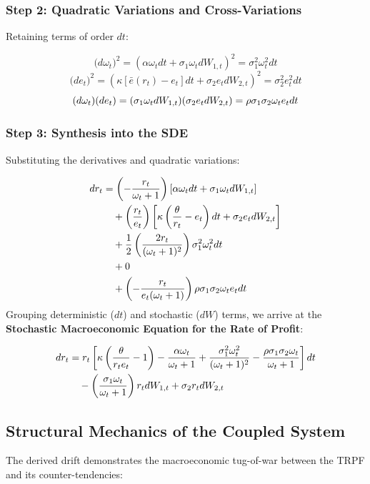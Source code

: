 \documentclass[11pt,letterpaper]{report}
\newcommand{\fitmath}[1]{\begingroup\setbox0=\hbox{$\displaystyle #1$}\ifdim\wd0>\linewidth\resizebox{\linewidth}{!}{$\displaystyle #1$}\else\displaystyle #1\fi\endgroup}
\begin{document}
\subsubsection{Step 2: Quadratic Variations and Cross-Variations}
Retaining terms of order $dt$:

\[
(d{\omega }_{t}{)}^{2}={\left({\alpha {\omega }_{t}dt+{\sigma }_{1}{\omega }_{t}d{W}_{1,t}}\right)}^{2}={\sigma }_{1}^{2}{\omega }_{t}^{2}dt
\]
\[
(d{e}_{t}{)}^{2}={\left({\kappa [\bar{e}({r}_{t})-{e}_{t}]dt+{\sigma }_{2}{e}_{t}d{W}_{2,t}}\right)}^{2}={\sigma }_{2}^{2}{e}_{t}^{2}dt
\]
\[\fitmath{(d{\omega }_{t})(d{e}_{t})=({\sigma }_{1}{\omega }_{t}d{W}_{1,t})({\sigma }_{2}{e}_{t}d{W}_{2,t})=\rho {\sigma }_{1}{\sigma }_{2}{\omega }_{t}{e}_{t}dt}\]
\subsubsection{Step 3: Synthesis into the SDE}
Substituting the derivatives and quadratic variations:

\[\fitmath{\begin{aligned} dr_t &= \left( -\frac{r_t}{\omega_t + 1} \right) \left[ \alpha \omega_t dt + \sigma_1 \omega_t dW_{1,t} \right] \\ &\quad + \left( \frac{r_t}{e_t} \right) \left[ \kappa \left( \frac{\theta}{r_t} - e_t \right) dt + \sigma_2 e_t dW_{2,t} \right] \\ &\quad + \frac{1}{2} \left( \frac{2r_t}{(\omega_t + 1)^2} \right) \sigma_1^2 \omega_t^2 dt \\ &\quad + 0 \\ &\quad + \left( -\frac{r_t}{e_t(\omega_t + 1)} \right) \rho \sigma_1 \sigma_2 \omega_t e_t dt \end{aligned}}\]
Grouping deterministic ($dt$) and stochastic ($dW$) terms, we arrive at the \textbf{Stochastic Macroeconomic Equation for the Rate of Profit}:

\[\fitmath{\begin{aligned} dr_t &= r_t \left[ \kappa \left( \frac{\theta}{r_t e_t} - 1 \right) - \frac{\alpha \omega_t}{\omega_t + 1} + \frac{\sigma_1^2 \omega_t^2}{(\omega_t + 1)^2} - \frac{\rho \sigma_1 \sigma_2 \omega_t}{\omega_t + 1} \right] dt \\ &\quad - \left( \frac{\sigma_1 \omega_t}{\omega_t + 1} \right) r_t dW_{1,t} + \sigma_2 r_t dW_{2,t} \end{aligned}}\]
\subsection{Structural Mechanics of the Coupled System}
The derived drift demonstrates the macroeconomic tug-of-war between the TRPF and its counter-tendencies:
\end{document}
